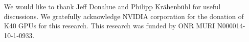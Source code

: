 \documentclass[10pt,twocolumn,letterpaper]{article}
\begin{document}
We would like to thank Jeff Donahue and Philipp Kr\"ahenb\"uhl for useful discussions. 
We  gratefully acknowledge NVIDIA corporation for the donation of K40 GPUs for this research. This research was funded by ONR MURI N000014-10-1-0933.
 




{\small


}
\end{document}
